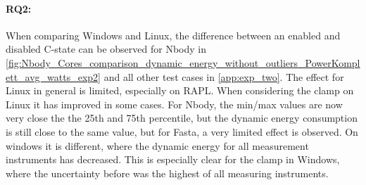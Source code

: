 \paragraph*{RQ2:} When comparing Windows and Linux, the difference between an enabled and disabled C-state can be observed for Nbody in \cref{fig:Nbody_Cores_comparison_dynamic_energy_without_outliers_PowerKomplett_avg_watts_exp2} and all other test cases in \cref{app:exp_two}. The effect for Linux in general is limited, especially on RAPL. When considering the clamp on Linux it has improved in some cases. For Nbody, the min/max values are now very close the the 25th and 75th percentile, but the dynamic energy consumption is still close to the same value, but for Fasta, a very limited effect is observed. On windows it is different, where the dynamic energy for all measurement instruments has decreased. This is especially clear for the clamp in Windows, where the uncertainty before was the highest of all measuring instruments.




